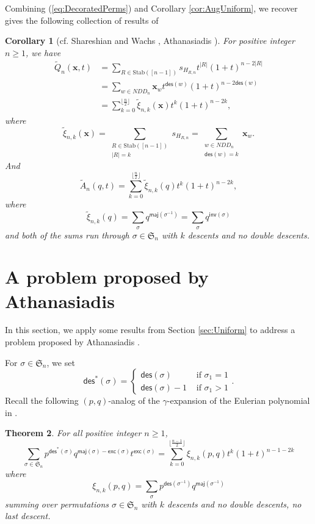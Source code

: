\documentclass[reqno]{amsart}
\newcommand{\des}{{\mathsf{des}}}
\newcommand{\inv}{{\mathsf{inv}}}
\newcommand{\exc}{{\mathsf{exc}}}
\newcommand{\maj}{{\mathsf{maj}}}
\newcommand{\Stab}{{\mathrm{Stab}}}
\renewcommand{\S}{{\mathfrak{S}}}
\newcommand{\x}{{\mathbf{x}}}
\newtheorem{thm}{Theorem}[section]
\newtheorem{cor}[thm]{Corollary}
\theoremstyle{definition}
\theoremstyle{remark}
\begin{document}
Combining (\ref{eq:DecoratedPerms}) and Corollary \ref{cor:AugUniform}, we recover  gives the following collection of results of \cite[Theorems 3.4 and 4.5]{ShareshianWachs2020}

\begin{cor}[cf. Shareshian and Wachs \cite{ShareshianWachs2020}, Athanasiadis \cite{AthanasiadisGamma}] \label{cor:DecoratedPerms}
For positive integer $n\ge 1$, we have 
\begin{align*}
    \widetilde{Q}_n(\x,t)
    &=\sum_{R\in\Stab([n-1])}s_{H_{R,n}}t^{|R|}(1+t)^{n-2|R|}\\
    &=\sum_{w\in NDD_n}\x_w t^{\des(w)}(1+t)^{n-2\des(w)}\\
    &=\sum_{k=0}^{\lfloor\frac{n}{2}\rfloor}\widetilde{\xi}_{n,k}(\x) t^k(1+t)^{n-2k},
\end{align*} 
where 
\[
    \widetilde{\xi}_{n,k}(\x)=\sum_{\substack{R\in\Stab([n-1])\\ |R|=k}}s_{H_{R,n}}=\sum_{\substack{w\in NDD_n \\ \des(w)=k}}\x_w.
\]
And 
\[
    \widetilde{A}_n(q,t)=\sum_{k=0}^{\lfloor\frac{n}{2}\rfloor}\widetilde{\xi}_{n,k}(q)t^k(1+t)^{n-2k},
\]
where
\[
    \widetilde{\xi}_{n,k}(q)=\sum_{\sigma}q^{\maj(\sigma^{-1})}=\sum_{\sigma}q^{\inv(\sigma)}
\]
and both of the sums run through $\sigma\in\S_n$ with $k$ descents and no double descents.
\end{cor}

\section{A problem proposed by Athanasiadis} \label{sec:AthanasiadisProblem}
In this section, we apply some results from Section \ref{sec:Uniform} to address a problem proposed by Athanasiadis \cite[Problem 2.5]{AthanasiadisGamma}.

For $\sigma\in\S_n$, we set  
\[
    \des^*(\sigma)=\begin{cases}
        \des(\sigma) & \text{ if }\sigma_1=1\\
        \des(\sigma)-1  & \text{ if }\sigma_1>1
    \end{cases}.
\]
Recall the following $(p,q)$-analog of the $\gamma$-expansion of the Eulerian polynomial in \cite[Theorem 2.3]{AthanasiadisGamma}.
\begin{thm} \label{thm:pqGammaPerm}
For all positive integer $n\ge 1$, 
\[
    \sum_{\sigma\in\S_n} p^{\des^*(\sigma)}q^{\maj(\sigma)-\exc(\sigma)}t^{\exc(\sigma)}=\sum_{k=0}^{\lfloor\frac{n-1}{2}\rfloor}\xi_{n,k}(p,q)t^{k}(1+t)^{n-1-2k}
\]    
where 
\[
    \xi_{n,k}(p,q)=\sum_{\sigma}p^{\des(\sigma^{-1})}q^{\maj(\sigma^{-1})}
\]
summing over permutations $\sigma\in\S_n$ with $k$ descents and no double descents, no last descent.
\end{thm}
\end{document}
